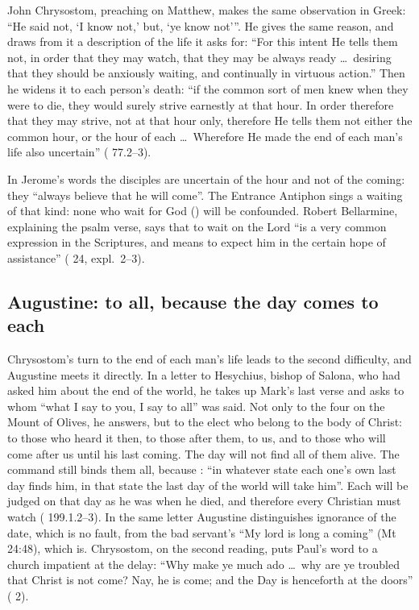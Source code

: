 John Chrysostom, preaching on Matthew, makes the same observation in Greek: ``He said not, `I know not,' but, `ye know not'''.
He gives the same reason, and draws from it a description of the life it
asks for: ``For this intent He tells them not, in order that they may watch,
that they may be always ready \ldots\ desiring that they should be anxiously
waiting, and continually in virtuous action.'' Then he widens it to each
person's death: ``if the common sort of men knew when they were to die, they
would surely strive earnestly at that hour. In order therefore that they may
strive, not at that hour only, therefore He tells them not either the common
hour, or the hour of each \ldots\ Wherefore He made the end of each man's
life also uncertain'' ( 77.2--3).

In Jerome's words the disciples are uncertain of the hour and not of the
coming: they ``always believe that he will come''. The Entrance Antiphon
sings a waiting of that kind: none who wait for God () will be confounded. Robert Bellarmine, explaining the psalm
verse, says that to wait on the Lord ``is a very common expression in the
Scriptures, and means to expect him in the certain hope of assistance''
( 24, expl.~2--3).

\subsection{Augustine: to all, because the day comes to each}

Chrysostom's turn to the end of each man's life leads to the second
difficulty, and Augustine meets it directly. In a letter to Hesychius, bishop of Salona, who had
asked him about the end of the world, he takes up Mark's last verse and asks
to whom ``what I say to you, I say to all'' was said. Not only to the four on
the Mount of Olives, he answers, but to the elect who belong to the body of
Christ: to those who heard it then, to those after them, to us, and to those
who will come after us until his last coming. The day will not find all of
them alive. The command still binds them all, because : ``in whatever state each one's own last day finds him, in
that state the last day of the world will take him''. Each will be judged on
that day as he was when he died, and therefore every Christian must watch
( 199.1.2--3). In the same letter Augustine distinguishes
ignorance of the date, which is no fault, from the bad servant's ``My lord is
long a coming'' (Mt 24:48), which is. Chrysostom, on the second reading, puts
Paul's word to a church impatient at the delay: ``Why make ye much ado
\ldots\ why are ye troubled that Christ is not come? Nay, he is come; and the
Day is henceforth at the doors'' ( 2).

